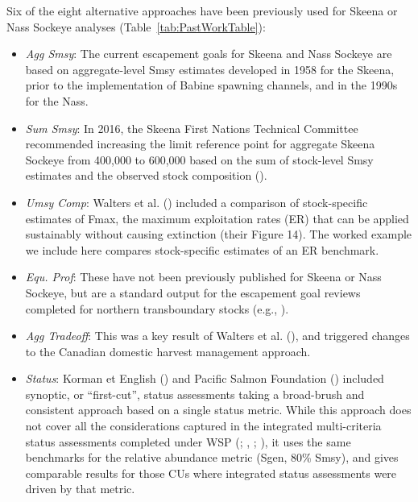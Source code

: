 \documentclass[french,11pt]{book}
\begin{document}
Six of the eight alternative approaches have been previously used for Skeena or Nass Sockeye analyses (Table~\ref{tab:PastWorkTable}):
\begin{itemize}

\item
  \emph{Agg Smsy}: The current escapement goals for Skeena and Nass Sockeye are based on aggregate-level Smsy estimates developed in 1958 for the Skeena, prior to the implementation of Babine spawning channels, and in the 1990s for the Nass.
\item
  \emph{Sum Smsy}: In 2016, the Skeena First Nations Technical Committee recommended increasing the limit reference point for aggregate Skeena Sockeye from 400,000 to 600,000 based on the sum of stock-level Smsy estimates and the observed stock composition ().
\item
  \emph{Umsy Comp}: Walters et al. () included a comparison of stock-specific estimates of Fmax, the maximum exploitation rates (ER) that can be applied sustainably without causing extinction (their Figure 14). The worked example we include here compares stock-specific estimates of an ER benchmark.
\item
  \emph{Equ. Prof}: These have not been previously published for Skeena or Nass Sockeye, but are a standard output for the escapement goal reviews completed for northern transboundary stocks (e.g., ).
\item
  \emph{Agg Tradeoff}: This was a key result of Walters et al. (), and triggered changes to the Canadian domestic harvest management approach.
\item
  \emph{Status}: Korman et English () and Pacific Salmon Foundation () included synoptic, or ``first-cut'', status assessments taking a broad-brush and consistent approach based on a single status metric. While this approach does not cover all the considerations captured in the integrated multi-criteria status assessments completed under WSP (; , ; ), it uses the same benchmarks for the relative abundance metric (Sgen, 80\% Smsy), and gives comparable results for those CUs where integrated status assessments were driven by that metric.

\end{itemize}
\end{document}
